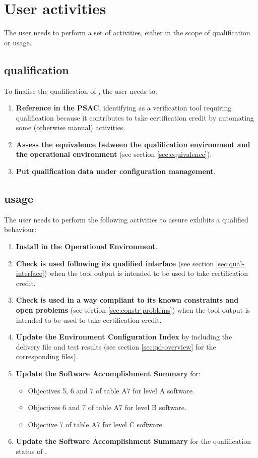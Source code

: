 \documentclass {report}
\begin{document}
\chapter{User activities}
\label{sec:user-act}
The user needs to perform a set of activities, either in the scope of \xcov{} qualification or \xcov{} usage.

\section{\xcov{} qualification}
To finalise the qualification of \xcov{}, the user needs to:
\begin{enumerate}
\item \textbf{Reference \xcov{} in the PSAC}, identifying \xcov{} as a verification tool requiring qualification because it contributes to take certification credit by automating some (otherwise manual) activities.
\item \textbf{Assess the equivalence between the qualification environment and the operational environment} (see section \ref{sec:equivalence}).
\item \textbf{Put qualification data under configuration management}.
\end{enumerate}

\section{\xcov{} usage}
The user needs to perform the following activities to assure \xcov{} exhibits a qualified behaviour:
\begin{enumerate}
\item \textbf{Install \xcov{} in the Operational Environment}.
\item \textbf{Check \xcov{} is used following its qualified interface} (see section \ref{sec:qual-interface}) when the tool output is intended to be used to take certification credit.
\item \textbf{Check \xcov{} is used in a way compliant to its known constraints and open problems} (see section \ref{sec:constr-problems}) when the tool output is intended to be used to take certification credit.
\item \textbf{Update the Environment Configuration Index} by including the delivery file and test results (see section \ref{sec:qd-overview} for the corresponding files).
\item \textbf{Update the Software Accomplishment Summary} for:
\begin{itemize}
\item Objectives 5, 6 and 7 of table A7 for level A software.
\item Objectives 6 and 7 of table A7 for level B software.
\item Objective 7 of table A7 for level C software.
\end{itemize}
\item \textbf{Update the Software Accomplishment Summary} for the qualification status of \xcov{}.
\end{enumerate}
\end{document}
